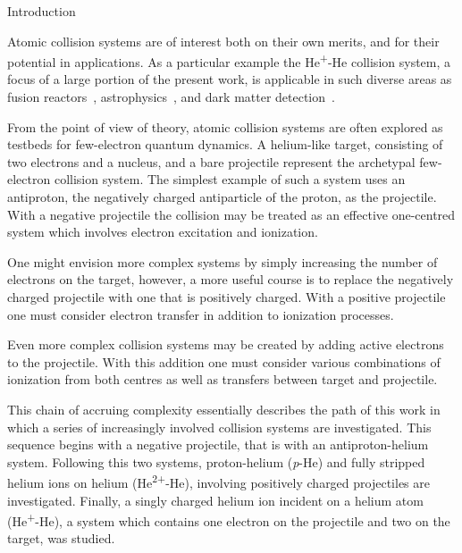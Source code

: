 \documentclass[a5paper, 9 pt]{extreport}
\begin{document}
\singlespacing

\setcounter{page}{3}

\cleardoublepage
{}
{}
\tableofcontents

\cleardoublepage
{}
{}
\listoftables

\cleardoublepage
{}
{}
\listoffigures

\newpage


\onehalfspacing  %

\begin{chapter}{Introduction \label{chap:intro}}

   Atomic collision systems are of interest both on their own merits, and for their potential in
   applications. As a  particular example the He\textsuperscript{+}-He collision system, a focus of a
   large portion of the present work, is applicable in such diverse areas as fusion
   reactors~\cite{fusion1, fusion2}, astrophysics~\cite{astro1, astro2}, and dark matter
   detection~\cite{dmdet}.

   From the point of view of theory, atomic collision systems are often explored as testbeds for
   few-electron quantum dynamics. A helium-like target, consisting of two electrons and a nucleus, and a
   bare projectile represent the archetypal few-electron collision system. The simplest example of such
   a system uses an antiproton, the negatively charged antiparticle of the proton, as the projectile.
   With a negative projectile the collision may be treated as an effective one-centred system which
   involves electron excitation and ionization.

   One might envision more complex systems by simply increasing the number of electrons on the target,
   however, a more useful course is to replace the negatively charged projectile with one that is
   positively charged. With a positive projectile one must consider electron transfer in addition to
   ionization processes.

   Even more complex collision systems may be created by adding active electrons to the projectile. With
   this addition one must consider various combinations of ionization from both centres as well as
   transfers between target and projectile.

   This chain of accruing complexity essentially describes the path of this work in which a series of
   increasingly involved collision systems are investigated. This sequence begins with a negative
   projectile, that is with an antiproton-helium system. Following this two systems, proton-helium
   (\textit{p}-He) and fully stripped helium ions on helium (He\textsuperscript{2+}-He), involving
   positively charged projectiles are investigated. Finally, a singly charged helium ion incident on
   a helium atom (He\textsuperscript{+}-He), a system which contains one electron on the projectile and
   two on the target, was studied.


\end{chapter}
\end{document}

